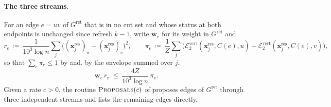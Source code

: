 \documentclass[11pt]{article}
\theoremstyle{remark}
\newcommand{\ww}{\mathbf w}
\newcommand{\xx}{\mathbf x}
\newcommand{\xxres}{\xx^{\mathrm{res}}}
\newcommand{\Ecalvert}[1]{\mathcal{E}^{\mathrm{vert}}_{#1}}
\newcommand{\Gret}{G^{\mathrm{ret}}}
\newcommand{\defeq}{\coloneqq}
\begin{document}
\paragraph{The three streams.}
For an edge $e=uv$ of $\Gret$ that is in no cut set and whose status at both
endpoints is unchanged since refresh $k-1$, write $\ww_e$ for its weight in
$\Gret$ and
\[
r_e\ \defeq\ \frac1{10^{3}\log n}\sum_j\bigl((\xxres_j)_u-(\xxres_j)_v\bigr)^{2},
\qquad
\pi_e\ \defeq\ \frac1Z\sum_j\bigl(\Ecalvert2(\xxres_j,C(e),u)+\Ecalvert2(\xxres_j,C(e),v)\bigr),
\]
so that $\sum_e\pi_e\le1$ by  and, by the envelope
 summed over $j$,
\begin{equation}\label{eq:resenv}
\ww_e\,r_e\ \le\ \frac{4Z}{10^{3}\log n}\,\pi_e .
\end{equation}
Given a rate $c>0$, the routine $\textsc{Proposals}(c)$ of 
proposes edges of $\Gret$ through three independent streams and lists the
remaining edges directly.
\end{document}
